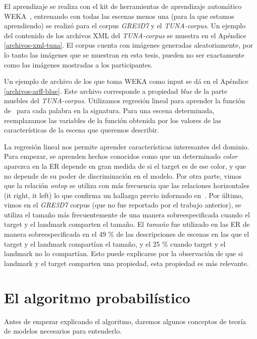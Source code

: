 El aprendizaje se realiza con el kit de herramientas de aprendizaje autom\'atico
WEKA~\cite{Hall:WEK09}, entrenando con todas las escenas menos una (para la que estamos aprendiendo) se realiz\'o para el corpus \textit{GRE3D7} y el \textit{TUNA-corpus}. Un ejemplo del contenido de los archivos XML del \textit{TUNA-corpus} se muestra en el Ap\'endice \ref{archivos-xml-tuna}. El corpus cuenta con im\'agenes generadas aleatoriamente, por lo tanto las im\'agenes que se muestran en esta tesis, pueden no ser exactamente como las im\'agenes mostradas a los participantes.

Un ejemplo de archivo de los que toma WEKA como input se d\'a en el Ap\'endice \ref{archivos-arff-blue}. Este archivo corresponde a propiedad {\it blue} 
de la parte muebles del \textit{TUNA-corpus}. Utilizamos regresi\'on lineal para aprender la funci\'on de
\puse\ para cada palabra en la signatura. Para una escena determinada, reemplazamos
las variables de la funci\'on obtenida por los valores de las caracter\'{i}sticas
de la escena que queremos describir.

La regresi\'on lineal nos permite aprender caracter\'{i}sticas interesantes
 del dominio. Para empezar, se aprenden hechos conocidos
como que un determinado {\it color} aparezca en la ER depende en gran medida de si el
target es de ese color, y que no depende de su
poder de discriminaci\'on en el modelo. Por otra parte, vimos que la relaci\'on {\it ontop}
 se utiliza con m\'as frecuencia que las relaciones horizontales
({it right}, {it left}) lo que confirma un hallazgo previo informado
en~\cite{viet:gene11}. Por \'ultimo, vimos en el
\textit{GRE3D7} corpus (que no fue reportado por el trabajo anterior), se utiliza el tama\~no
m\'as frecuentemente de una manera sobreespecificada cuando el
target y el landmark comparten el tama\~no. El {\it tama\~no} fue utilizado en las ER de manera sobreespecificada en el 49 \% de
las descripciones de escenas en las que el target y el landmark compart\'ian el tama\~no,
y el 25 \% cuando target y el landmark no lo compart\'ian. Esto puede explicarse por la observaci\'on de que si landmark y el target comparten una propiedad, esta propiedad es m\'as relevante.

\section{El algoritmo probabil\'istico}
\label{sec:algoritmo_probabilistico}
Antes de empezar explicando el algoritmo, daremos algunos conceptos de teor\'ia de modelos necesarios para entenderlo.

